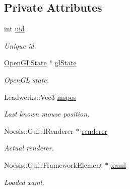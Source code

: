 \subsection*{Private Attributes}
\begin{DoxyCompactItemize}
\item 
\hypertarget{class_u_i_renderer_a191e33b40b855c04117de4d49d48e99b}{int \hyperlink{class_u_i_renderer_a191e33b40b855c04117de4d49d48e99b}{uid}}\label{class_u_i_renderer_a191e33b40b855c04117de4d49d48e99b}

\begin{DoxyCompactList}\small\item\em Unique id. \end{DoxyCompactList}\item 
\hypertarget{class_u_i_renderer_a44cffd1da636ee3d5a03ebee3e880d26}{\hyperlink{class_open_g_l_state}{Open\-G\-L\-State} $\ast$ \hyperlink{class_u_i_renderer_a44cffd1da636ee3d5a03ebee3e880d26}{gl\-State}}\label{class_u_i_renderer_a44cffd1da636ee3d5a03ebee3e880d26}

\begin{DoxyCompactList}\small\item\em Open\-G\-L state. \end{DoxyCompactList}\item 
\hypertarget{class_u_i_renderer_ab365eca2491514a80282a621626920d6}{Leadwerks\-::\-Vec3 \hyperlink{class_u_i_renderer_ab365eca2491514a80282a621626920d6}{mspos}}\label{class_u_i_renderer_ab365eca2491514a80282a621626920d6}

\begin{DoxyCompactList}\small\item\em Last known mouse position. \end{DoxyCompactList}\item 
\hypertarget{class_u_i_renderer_a9f78449d8d996e66f1e1d75c3cd6276f}{Noesis\-::\-Gui\-::\-I\-Renderer $\ast$ \hyperlink{class_u_i_renderer_a9f78449d8d996e66f1e1d75c3cd6276f}{renderer}}\label{class_u_i_renderer_a9f78449d8d996e66f1e1d75c3cd6276f}

\begin{DoxyCompactList}\small\item\em Actual renderer. \end{DoxyCompactList}\item 
\hypertarget{class_u_i_renderer_ad9cc0fe1fcbf5e5182f7a18045c4ec07}{Noesis\-::\-Gui\-::\-Framework\-Element $\ast$ \hyperlink{class_u_i_renderer_ad9cc0fe1fcbf5e5182f7a18045c4ec07}{xaml}}\label{class_u_i_renderer_ad9cc0fe1fcbf5e5182f7a18045c4ec07}

\begin{DoxyCompactList}\small\item\em Loaded xaml. \end{DoxyCompactList}\end{DoxyCompactItemize}


